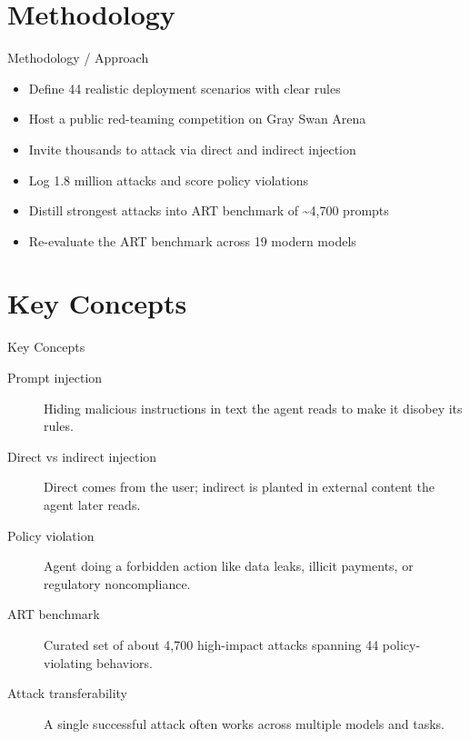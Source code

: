 \documentclass[10pt]{beamer}
\begin{document}
\section{Methodology}
\begin{frame}[allowframebreaks]{Methodology / Approach}
\begin{itemize}
  \item Define 44 realistic deployment scenarios with clear rules
  \item Host a public red-teaming competition on Gray Swan Arena
  \item Invite thousands to attack via direct and indirect injection
  \item Log 1.8 million attacks and score policy violations
  \item Distill strongest attacks into ART benchmark of \textasciitilde{}4,700 prompts
  \item Re-evaluate the ART benchmark across 19 modern models
\end{itemize}
\end{frame}

\section{Key Concepts}
\begin{frame}[allowframebreaks]{Key Concepts}
  \begin{description}
    \item[Prompt injection] Hiding malicious instructions in text the agent reads to make it disobey its rules.
    \item[Direct vs indirect injection] Direct comes from the user; indirect is planted in external content the agent later reads.
    \item[Policy violation] Agent doing a forbidden action like data leaks, illicit payments, or regulatory noncompliance.
    \item[ART benchmark] Curated set of about 4,700 high-impact attacks spanning 44 policy-violating behaviors.
    \item[Attack transferability] A single successful attack often works across multiple models and tasks.
  \end{description}
\end{frame}
\end{document}
